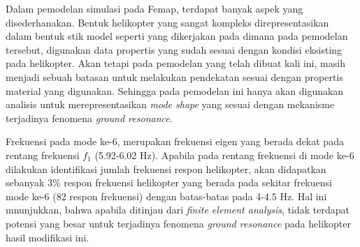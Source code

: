 Dalam pemodelan simulasi pada Femap, terdapat banyak aspek yang disederhanakan. Bentuk helikopter yang sangat kompleks direpresentasikan dalam bentuk stik model seperti yang dikerjakan pada \cite{Grzegorz2016THESP} dimana pada pemodelan tersebut, digunakan data propertis yang sudah sesuai dengan kondisi eksisting pada helikopter. Akan tetapi pada pemodelan yang telah dibuat kali ini, masih menjadi sebuah batasan untuk melakukan pendekatan sesuai dengan propertis material yang digunakan. Sehingga pada pemodelan ini hanya akan digunakan analisis untuk merepresentasikan \textit{mode shape} yang sesuai dengan mekanisme terjadinya fenomena \textit{ground resonance}.

Frekuensi pada mode ke-6, merupakan frekuensi eigen yang berada dekat pada rentang frekuensi $f_1$ (5.92-6.02 Hz). Apabila pada rentang frekuensi di mode ke-6 dilakukan identifikasi jumlah frekuensi respon helikopter, akan didapatkan sebanyak $3\%$ respon frekuensi helikopter yang berada pada sekitar frekuensi mode ke-6 (82 respon frekuensi) dengan batas-batas pada 4-4.5 Hz. Hal ini mnunjukkan, bahwa apabila ditinjau dari \textit{finite element analysis}, tidak terdapat potensi yang besar untuk terjadinya fenomena \textit{ground resonance} pada helikopter hasil modifikasi ini. 